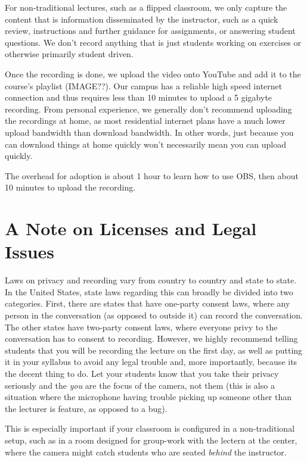 \documentclass[sigconf]{acmart}
\begin{document}
For non-traditional lectures, such as a flipped classroom, we only capture the content that is information disseminated by the instructor, such as a quick review, instructions and further guidance for assignments, or answering student questions.
We don't record anything that is just students working on exercises or otherwise primarily student driven.

Once the recording is done, we upload the video onto YouTube and add it to the course's playlist (IMAGE??).
Our campus has a reliable high speed internet connection and thus requires less than 10 minutes to upload a 5 gigabyte recording.
From personal experience, we generally don't recommend uploading the recordings at home, as most residential internet plans have a much lower upload bandwidth than download bandwidth.
In other words, just because you can download things at home quickly won't necessarily mean you can upload quickly.

The overhead for adoption is about 1 hour to learn how to use OBS, then about 10 minutes to upload the recording.






\section{A Note on Licenses and Legal Issues}

Laws on privacy and recording vary from country to country and state to state.
In the United States, state laws regarding this can broadly be divided into two categories.
First, there are states that have one-party consent laws, where any person in the conversation (as opposed to outside it) can record the conversation.
The other states have two-party consent laws, where everyone privy to the conversation has to consent to recording.
However, we highly recommend telling students that you will be recording the lecture on the first day, as well as putting it in your syllabus to avoid any legal trouble and, more importantly, because its the decent thing to do.
Let your students know that you take their privacy seriously and the \textit{you} are the focus of the camera, not them (this is also a situation where the microphone having trouble picking up someone other than the lecturer is feature, as opposed to a bug).

This is especially important if your classroom is configured in a non-traditional setup, such as in a room designed for group-work with the lectern at the center, where the camera might catch students who are seated \textit{behind} the instructor.





\end{document}
